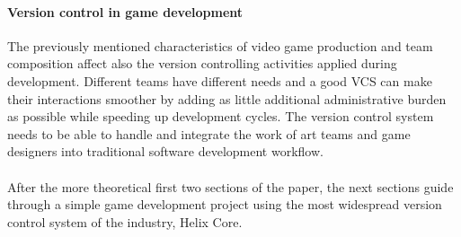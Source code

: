 \paragraph{Version control in game development}
The previously mentioned characteristics of video game production and team composition affect also the version controlling 
activities applied during development. Different teams have different needs and a good VCS can make their interactions smoother 
by adding as little additional administrative burden as possible while speeding up development cycles. The version control
system needs to be able to handle and integrate the work of art teams and game designers into traditional software development
workflow. 

\paragraph{}
After the more theoretical first two sections of the paper, the next sections guide through a simple game development
project using the most widespread version control system of the industry, 
Helix Core\textsuperscript{\texttrademark}.